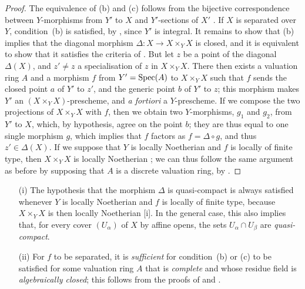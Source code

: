 \begin{proof}
The equivalence of (b) and (c) follows from the bijective correspondence between $Y$-morphisms from $Y'$ to $X$ and $Y'$-sections of $X'$ .
If $X$ is separated over $Y$, condition~(b) is satisfied, by , since $Y'$ is integral.
It remains to show that (b) implies that the diagonal morphism $\Delta:X\to X\times_Y X$ is closed, and it is equivalent to show that it satisfies the criteria of .
But let $z$ be a point of the diagonal $\Delta(X)$, and $z'\neq z$ a specialisation of $z$ in $X\times_Y X$.
There then exists  a valuation ring $A$ and a morphism $f$ from $Y'=\operatorname{Spec}(A)$ to $X\times_Y X$ such that $f$ sends the closed point $a$ of $Y'$ to $z'$, and the generic point $b$ of $Y'$ to $z$;
this morphism makes $Y'$ an $(X\times_Y X)$-prescheme, and \emph{a fortiori} a $Y$-prescheme.
If we compose the two projections of $X\times_Y X$ with $f$, then we obtain two $Y$-morphisms, $g_1$ and $g_2$, from $Y'$ to $X$, which, by hypothesis, agree on the point $b$;
they are thus equal to one single morphism $g$, which implies  that $f$ factors as $f=\Delta\circ g$, and thus $z'\in\Delta(X)$.
If we suppose that $Y$ is locally Noetherian and $f$ is locally of finite type, then $X\times_Y X$ is locally Noetherian ;
we can thus follow the same argument as before by supposing that $A$ is a discrete valuation ring, by .
\end{proof}

\begin{remark}[7.2.4]
\label{II.7.2.4}
\begin{enumerate}
    \item[\rm{(i)}] The hypothesis that the morphism $\Delta$ is quasi-compact is always satisfied whenever $Y$ is locally Noetherian and $f$ is locally of finite type, because $X\times_Y X$ is then locally Noetherian [i].
        In the general case, this also implies that, for every cover $(U_\alpha)$ of $X$ by affine opens, the sets $U_\alpha\cap U_\beta$ are \emph{quasi-compact}.
    \item[\rm{(ii)}] For $f$ to be separated, it is \emph{sufficient} for condition~(b) or (c) to be satisfied for some valuation ring $A$ that is \emph{complete} and whose residue field is \emph{algebraically closed};
        this follows from the proofs of  and .
\end{enumerate}
\end{remark}


